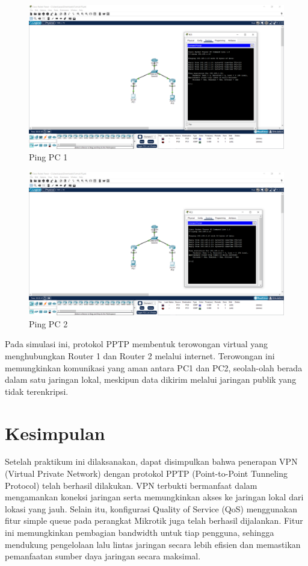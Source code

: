     \begin{figure}[H]
        \centering
        \includegraphics[width=0.5\linewidth]{P1/img/pc1.png}
        \caption{Ping PC 1}
        \label{fig:Pengujian-koneksi}
    \end{figure}

    \begin{figure}[H]
        \centering
        \includegraphics[width=0.5\linewidth]{P1/img/pc2.png}
        \caption{Ping PC 2}
        \label{fig:Pengujian-koneksi}
    \end{figure}

Pada simulasi ini, protokol PPTP membentuk terowongan virtual yang menghubungkan Router 1 dan Router 2 melalui internet. Terowongan ini memungkinkan komunikasi yang aman antara PC1 dan PC2, seolah-olah berada dalam satu jaringan lokal, meskipun data dikirim melalui jaringan publik yang tidak terenkripsi.

\section{Kesimpulan}
Setelah praktikum ini dilaksanakan, dapat disimpulkan bahwa penerapan VPN (Virtual Private Network) dengan protokol PPTP (Point-to-Point Tunneling Protocol) telah berhasil dilakukan. VPN terbukti bermanfaat dalam mengamankan koneksi jaringan serta memungkinkan akses ke jaringan lokal dari lokasi yang jauh. Selain itu, konfigurasi Quality of Service (QoS) menggunakan fitur simple queue pada perangkat Mikrotik juga telah berhasil dijalankan. Fitur ini memungkinkan pembagian bandwidth untuk tiap pengguna, sehingga mendukung pengelolaan lalu lintas jaringan secara lebih efisien dan memastikan pemanfaatan sumber daya jaringan secara maksimal.

